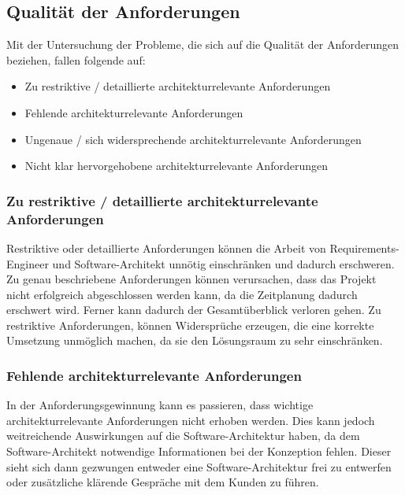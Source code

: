 \subsection{Qualit\"at der Anforderungen}

Mit der Untersuchung der Probleme, die sich auf die Qualität der Anforderungen beziehen, fallen folgende auf:
\begin{itemize}
\item Zu restriktive / detaillierte architekturrelevante Anforderungen
\item Fehlende architekturrelevante Anforderungen
\item Ungenaue / sich widersprechende architekturrelevante Anforderungen
\item Nicht klar hervorgehobene architekturrelevante Anforderungen\\
\end{itemize}

\subsubsection{Zu restriktive / detaillierte architekturrelevante Anforderungen}
Restriktive oder detaillierte Anforderungen können die Arbeit von Requirements-Engineer und Software-Architekt unnötig einschränken und dadurch erschweren. Zu genau beschriebene Anforderungen können verursachen, dass das Projekt nicht erfolgreich abgeschlossen werden kann, da die Zeitplanung dadurch erschwert wird. Ferner kann dadurch der Gesamtüberblick verloren gehen. Zu restriktive Anforderungen, können Widersprüche erzeugen, die eine korrekte Umsetzung unmöglich machen, da sie den Lösungsraum zu sehr einschränken. 

\subsubsection{Fehlende architekturrelevante Anforderungen}
In der Anforderungsgewinnung kann es passieren, dass wichtige architekturrelevante Anforderungen nicht erhoben werden. Dies kann jedoch weitreichende Auswirkungen auf die Software-Architektur haben, da dem Software-Architekt notwendige Informationen bei der Konzeption fehlen. Dieser sieht sich dann gezwungen entweder eine Software-Architektur frei zu entwerfen oder zusätzliche klärende Gespräche mit dem Kunden zu führen.

